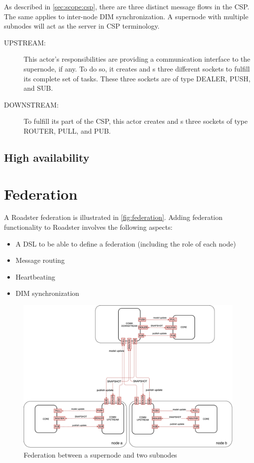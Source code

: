As described in \autoref{sec:scope:csp}, there are three distinct message flows
in the \gls{CSP}. The same applies to inter-node DIM synchronization. A
supernode with multiple subnodes will act as the server in CSP terminology.

\begin{description}
	\item [UPSTREAM:]
		This actor's responsibilities are providing a
		communication interface to the supernode, if any. To do so, it
		creates and s three different sockets to fulfill
		its complete set of tasks. These three sockets are of type
		DEALER, PUSH, and SUB.

	\item [DOWNSTREAM:]
		To fulfill its part of the CSP, this actor creates
		and s three sockets of type ROUTER, PULL, and PUB.
\end{description}


\subsection{High availability}

\section{Federation}\label{sec:approach:federation}
A Roadster federation is illustrated in \autoref{fig:federation}. Adding federation
functionality to Roadster involves the following aspects:
\begin{itemize}
	\item A \gls{DSL} to be able to define a federation (including the role of each node)
	\item Message routing
	\item Heartbeating
	\item DIM synchronization
\end{itemize}

\begin{figure}[]
	\includegraphics[width=\textwidth]{img/federation_protocol.pdf}
	\caption{Federation between a supernode and two subnodes}
	\label{fig:federation}
\end{figure}

